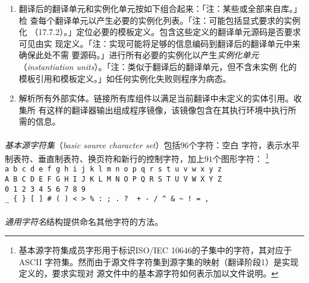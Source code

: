 \begin{enumerate}[label={\arabic*}]
{    产生的标记作为翻译单元进行语法和语义分析。「注：分析与翻译标记的过程可能偶尔
    会有一个标记被替换成其他标记序列的情况（17.2）。」「注：源文件，翻译单元和翻
    译后的翻译单元不一定存成文件，这些实体与外部表示间也不一定存在一一对应关系。
    描述只是概念上的，且不指定某一特定实现。」}
  \item{翻译后的翻译单元和实例化单元按如下组合起来：「注：某些或全部来自库。」检
    查每个翻译单元以产生必要的实例化列表。「注：可能包括显式要求的实例化
    （17.7.2）。」定位必要的模板定义。包含这些定义的翻译单元源码是否要求可见由实
    现定义。「注：实现可能将足够的信息编码到翻译后的翻译单元中来确保此处不需
    要源码。」进行所有必要的实例化以产生\textit{实例化单元}
    （\textit{instantiation units}）。「注：类似于翻译后的翻译单元，但不含未实例
    化的模板引用和模板定义。」如任何实例化失败则程序为病态。}
  \item{解析所有外部实体。链接所有库组件以满足当前翻译中未定义的实体引用。收集所
    有这样的翻译器输出组成程序镜像，该镜像包含在其执行环境中执行所需的信息。}
\end{enumerate}

\paragraph{}
\textit{基本源字符集}（\textit{basic source character set}）包括$96$个字符：空白
字符，表示水平制表符、垂直制表符、换页符和新行的控制字符，加上$91$个图形字符：
\footnote{基本源字符集成员字形用于标识ISO/IEC 10646的子集中的字符，其对应于ASCII
字符集。然而由于源文件字符集到源字集的映射（翻译阶段1）是实现定义的，要求实现对
源文件中的基本源字符如何表示加以文件说明。}                                   \\
\mbox{\qquad \texttt{a b c d e f g h i j k l m n o p q r s t u v w x y z}}    \\
\mbox{\qquad \texttt{A B C D E F G H I J K L M N O P Q R S T U V W X Y Z}}    \\
\mbox{\qquad \texttt{0 1 2 3 4 5 6 7 8 9}}                                    \\
\mbox{\qquad \texttt{\_ \{ \} [ ] \# ( ) \textless{} \textgreater{} \% :\ ; .\
?\ \textasteriskcentered{} + - / \textasciicircum{} \& \textbar{}
\textasciitilde{} !\ = , \bs{} \dq{} \sq}}

\paragraph{}
\textit{通用字符名}结构提供命名其他字符的方法。


